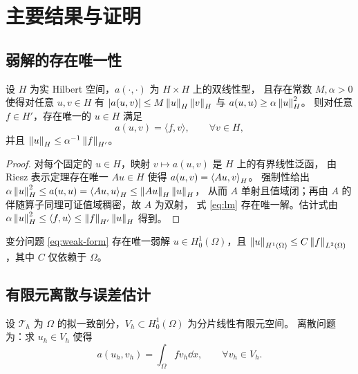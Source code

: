 \chapter{主要结果与证明}

\section{弱解的存在唯一性}

\begin{theorem}\label{thm:lm}
设 $H$ 为实 Hilbert 空间，$a(\cdot,\cdot)$ 为 $H\times H$ 上的双线性型，
且存在常数 $M,\alpha>0$ 使得对任意 $u,v\in H$ 有
$\left\lvert a(u,v)\right\rvert\le M\left\lVert u\right\rVert_H\left\lVert v\right\rVert_H$ 与 $a(u,u)\ge \alpha\left\lVert u\right\rVert_H^2$。
则对任意 $f\in H'$，存在唯一的 $u\in H$ 满足
\begin{equation}\label{eq:lm}
a(u,v)=\langle f,v\rangle, \qquad \forall v\in H,
\end{equation}
并且 $\left\lVert u\right\rVert_H\le \alpha^{-1}\left\lVert f\right\rVert_{H'}$。
\end{theorem}

\begin{proof}
对每个固定的 $u\in H$，映射 $v\mapsto a(u,v)$ 是 $H$ 上的有界线性泛函，
由 Riesz 表示定理存在唯一 $Au\in H$ 使得 $a(u,v)=\left\langle Au,v\right\rangle_H$。
强制性给出 $\alpha\left\lVert u\right\rVert_H^2\le a(u,u)=\left\langle Au,u\right\rangle_H\le\left\lVert Au\right\rVert_H\left\lVert u\right\rVert_H$，
从而 $A$ 单射且值域闭；再由 $A$ 的伴随算子同理可证值域稠密，故 $A$ 为双射，
式 \eqref{eq:lm} 存在唯一解。估计式由 $\alpha\left\lVert u\right\rVert_H^2\le\langle f,u\rangle\le\left\lVert f\right\rVert_{H'}\left\lVert u\right\rVert_H$ 得到。
\end{proof}

\begin{corollary}\label{cor:exist}
变分问题 \eqref{eq:weak-form} 存在唯一弱解 $u\in H_0^1(\Omega)$，且
$\left\lVert u\right\rVert_{H^1(\Omega)}\le C\left\lVert f\right\rVert_{L^2(\Omega)}$，其中 $C$ 仅依赖于 $\Omega$。
\end{corollary}

\section{有限元离散与误差估计}

设 $\mathcal{T}_h$ 为 $\Omega$ 的拟一致剖分，$V_h\subset H_0^1(\Omega)$ 为分片线性有限元空间。
离散问题为：求 $u_h\in V_h$ 使得
\begin{equation}\label{eq:discrete}
a(u_h,v_h)=\int_\Omega f v_h \dd x,\qquad \forall v_h\in V_h.
\end{equation}

